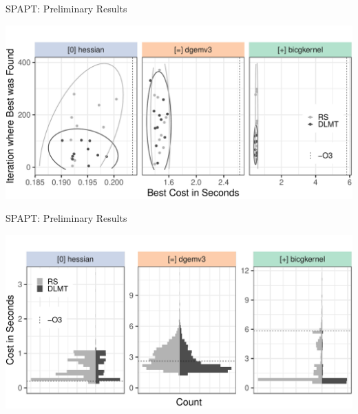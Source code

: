 \documentclass[10pt, compress, aspectratio=169, xcolor={table,usenames,dvipsnames}]{beamer}
\begin{document}
\begin{frame}[label={sec:org5057b6f}]{SPAPT: Preliminary Results}
\begin{center}
\begin{center}
\includegraphics[width=.86\linewidth]{../../../img/iteration_best_comparison.pdf}
\end{center}
\end{center}
\end{frame}
\begin{frame}[label={sec:org6eb1fdd}]{SPAPT: Preliminary Results}
\begin{center}
\begin{center}
\includegraphics[width=.89\linewidth]{../../../img/split_histograms.pdf}
\end{center}
\end{center}
\end{frame}
\end{document}
